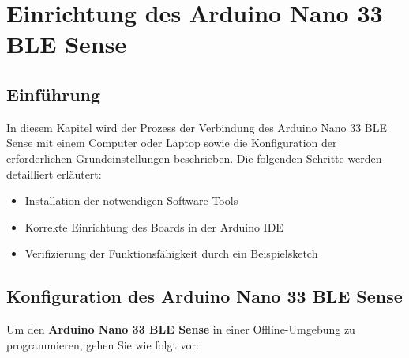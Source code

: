 %
%
%



\chapter{Einrichtung des Arduino Nano 33 BLE Sense}\label{ArduinoNanoBLE}

\section{Einführung}

In diesem Kapitel wird der Prozess der Verbindung des Arduino Nano 33 BLE Sense mit einem Computer oder Laptop sowie die Konfiguration der erforderlichen Grundeinstellungen beschrieben. Die folgenden Schritte werden detailliert erläutert:

\begin{itemize}
	\item Installation der notwendigen Software-Tools
	\item Korrekte Einrichtung des Boards in der Arduino IDE
	\item Verifizierung der Funktionsfähigkeit durch ein Beispielsketch
\end{itemize}

\section{Konfiguration des Arduino Nano 33 BLE Sense}

Um den \textbf{Arduino Nano 33 BLE Sense} in einer Offline-Umgebung zu programmieren, gehen Sie wie folgt vor:

